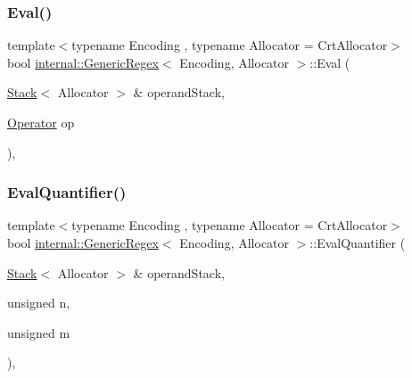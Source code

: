 \mbox{\label{classinternal_1_1GenericRegex_a0cc7e9e0fa434ded7ed37de54c49ce26}} 
\subsubsection{\texorpdfstring{Eval()}{Eval()}}
{\footnotesize\ttfamily template$<$typename Encoding , typename Allocator  = Crt\+Allocator$>$ \\
bool \hyperlink{classinternal_1_1GenericRegex}{internal\+::\+Generic\+Regex}$<$ Encoding, Allocator $>$\+::Eval (\begin{DoxyParamCaption}\item[{\hyperlink{classinternal_1_1Stack}{Stack}$<$ Allocator $>$ \&}]{operand\+Stack,  }\item[{\hyperlink{classinternal_1_1GenericRegex_acd9c0338546415c6d6dabdb76f8be673}{Operator}}]{op }\end{DoxyParamCaption})\hspace{0.3cm}{\ttfamily [inline]}, {\ttfamily [private]}}

\mbox{\label{classinternal_1_1GenericRegex_a71f934ac6c4b2b4f63b0c5fc68797933}} 
\subsubsection{\texorpdfstring{Eval\+Quantifier()}{EvalQuantifier()}}
{\footnotesize\ttfamily template$<$typename Encoding , typename Allocator  = Crt\+Allocator$>$ \\
bool \hyperlink{classinternal_1_1GenericRegex}{internal\+::\+Generic\+Regex}$<$ Encoding, Allocator $>$\+::Eval\+Quantifier (\begin{DoxyParamCaption}\item[{\hyperlink{classinternal_1_1Stack}{Stack}$<$ Allocator $>$ \&}]{operand\+Stack,  }\item[{unsigned}]{n,  }\item[{unsigned}]{m }\end{DoxyParamCaption})\hspace{0.3cm}{\ttfamily [inline]}, {\ttfamily [private]}}

